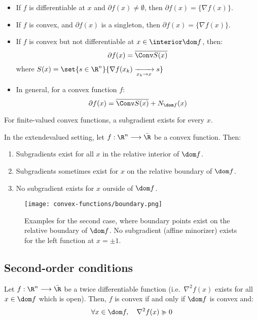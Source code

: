 \begin{itemize}
    \item If $f$ is differentiable at $x$ and $\partial f(x)\neq\emptyset$, then $\partial f(x) = \{\nabla f(x)\}$.
    \item If $f$ is convex, and $\partial f(x)$ is a singleton, then $\partial f(x) = \{\nabla f(x)\}$.
    \item If $f$ is convex but not differentiable at $x\in\interior\dom f$, then:
    \begin{equation}
        \partial f(x) = \overline{\Conv S(x)}
    \end{equation}
    where $S(x) = \set{s\in\R^n}{\nabla f(x_k) \xrightarrow[x_k\to x]{} s}$
    \item In general, for a convex function $f$:
    \begin{equation}
        \partial f(x) = \overline{\Conv S(x)} + N_{\dom f}(x)
    \end{equation}
\end{itemize}

\begin{property}
    For finite-valued convex functions, a subgradient exists for every $x$.
\end{property}

\begin{property}
    In the extendevalued setting, let $f:\R^n\longrightarrow\bar{\R}$ be a convex function. Then:
\begin{enumerate}
    \item Subgradients exist for all $x$ in the relative interior of $\dom f$.
    \item Subgradients sometimes exist for $x$ on the relative boundary of $\dom f$.
    \item No subgradient exists for $x$ ourside of $\dom f$.
\end{enumerate}

\end{property}
\begin{figure}[H]
    \centering
    \texttt{[image: convex-functions/boundary.png]}
    \caption{Examples for the second case, where boundary points exist on the relative boundary of $\dom f$. No subgradient (affine minorizer) exists for the left function at $x=\pm1$.}
\end{figure}

\subsection{Second-order conditions}
\begin{property}
    Let $f:\R^n\longrightarrow\bar{\R}$ be a twice differentiable function (i.e.~$\nabla^2f(x)$ exists for all $x\in\dom f$ which is open). Then, $f$ is convex if and only if $\dom f$ is convex and:
    \begin{equation}
        \forall x\in\dom f,\quad \nabla^2 f(x) \succcurlyeq 0
    \end{equation}
\end{property}

